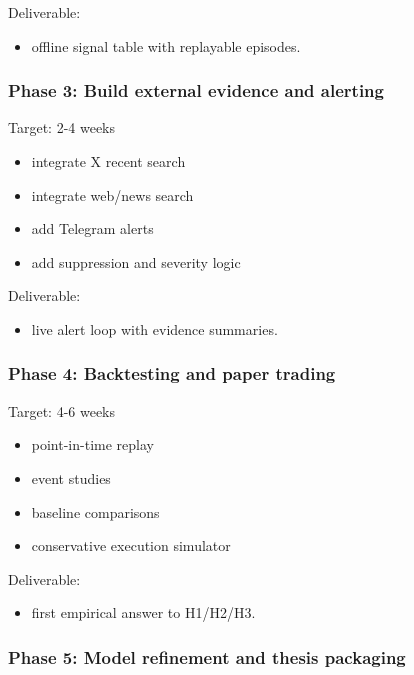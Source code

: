 \documentclass[
]{article}
\providecommand{\tightlist}{%
  \setlength{\itemsep}{0pt}\setlength{\parskip}{0pt}}
\begin{document}
Deliverable:

\begin{itemize}
\tightlist
\item
  offline signal table with replayable episodes.
\end{itemize}

\subsubsection{Phase 3: Build external evidence and
alerting}\label{phase-3-build-external-evidence-and-alerting}

Target: 2-4 weeks

\begin{itemize}
\tightlist
\item
  integrate X recent search
\item
  integrate web/news search
\item
  add Telegram alerts
\item
  add suppression and severity logic
\end{itemize}

Deliverable:

\begin{itemize}
\tightlist
\item
  live alert loop with evidence summaries.
\end{itemize}

\subsubsection{Phase 4: Backtesting and paper
trading}\label{phase-4-backtesting-and-paper-trading}

Target: 4-6 weeks

\begin{itemize}
\tightlist
\item
  point-in-time replay
\item
  event studies
\item
  baseline comparisons
\item
  conservative execution simulator
\end{itemize}

Deliverable:

\begin{itemize}
\tightlist
\item
  first empirical answer to H1/H2/H3.
\end{itemize}

\subsubsection{Phase 5: Model refinement and thesis
packaging}\label{phase-5-model-refinement-and-thesis-packaging}
\end{document}
